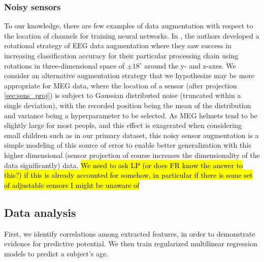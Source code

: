 \documentclass[utf8]{frontiersSCNS} %
\begin{document}


\subsubsection{Noisy sensors}

To our knowledge, there are few examples of data augmentation with respect to the location of channels for training neural networks. In \cite{Krell2017}, the authors developed a rotational strategy of EEG data augmentation where they saw success in increasing classification accuracy for their particular processing chain using rotations in three-dimensional space of $\pm 18^{\circ}$ around the y- and z-axes. We consider an alternative augmentation strategy that we hypothesize may be more appropriate for MEG data, where the location of a sensor (after projection \ref{sec:sens_proj}) is subject to Gaussian distributed noise (truncated within a single deviation), with the recorded position being the mean of the distribution and variance being a hyperparameter to be selected. As MEG helmets tend to be slightly large for most people, and this effect is exagerated when considering small children such as in our primary dataset, this noisy sensor augmentation is a simple modeling of this source of error to enable better generalization with this higher dimensional (sensor projection of course increases the dimensionality of the data significantly) data. \hl{We need to ask LP (or does FR know the answer to this?) if this is already accounted for somehow, in particular if there is some set of adjustable sensors I might be unaware of}

\subsection{Data analysis}

First, we identify correlations among extracted features, in order to demonstrate evidence for predictive potential. We then train regularized multilinear regression models to predict a subject's age.
\end{document}
